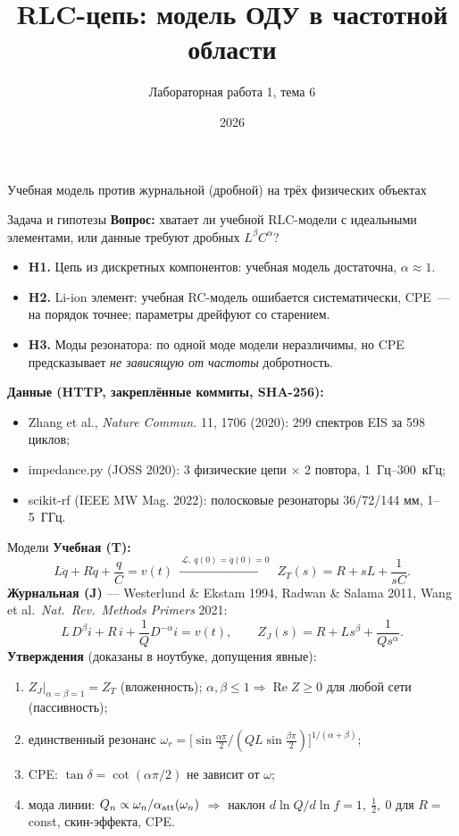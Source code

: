 \documentclass[aspectratio=169,11pt]{beamer}
\title{RLC-цепь: модель ОДУ в частотной области}
\subtitle{Лабораторная работа 1, тема 6}
\date{2026}
\begin{document}
\begin{frame}
  \titlepage
  \centering\small Учебная модель против журнальной (дробной) на трёх физических объектах
\end{frame}

\begin{frame}{Задача и гипотезы}
  \textbf{Вопрос:} хватает ли учебной RLC-модели с идеальными элементами, или данные требуют дробных $L^{\beta}C^{\alpha}$?
  \medskip
  \begin{itemize}
    \item \textbf{H1.} Цепь из дискретных компонентов: учебная модель достаточна, $\alpha\approx1$.
    \item \textbf{H2.} Li-ion элемент: учебная RC-модель ошибается систематически, CPE~--- на порядок точнее; параметры дрейфуют со старением.
    \item \textbf{H3.} Моды резонатора: по одной моде модели неразличимы, но CPE предсказывает \emph{не зависящую от частоты} добротность.
  \end{itemize}
  \medskip
  \textbf{Данные (HTTP, закреплённые коммиты, SHA-256):}
  \begin{itemize}\small
    \item Zhang et al., \emph{Nature Commun.} 11, 1706 (2020): 299 спектров EIS за 598 циклов;
    \item impedance.py (JOSS 2020): 3 физические цепи $\times$ 2 повтора, 1~Гц--300~кГц;
    \item scikit-rf (IEEE MW Mag. 2022): полосковые резонаторы 36/72/144 мм, 1--5~ГГц.
  \end{itemize}
\end{frame}

\begin{frame}{Модели}
  \textbf{Учебная (T):}
  \[
    L\ddot q+R\dot q+\frac{q}{C}=v(t)\ \xrightarrow{\ \mathcal L,\ q(0)=\dot q(0)=0\ }\ Z_T(s)=R+sL+\frac{1}{sC}.
  \]
  \textbf{Журнальная (J)} — Westerlund \& Ekstam 1994, Radwan \& Salama 2011, Wang et al.\ \emph{Nat.\ Rev.\ Methods Primers} 2021:
  \[
    L\,D^{\beta}i+R\,i+\frac1Q D^{-\alpha}i=v(t),\qquad Z_J(s)=R+Ls^{\beta}+\frac{1}{Qs^{\alpha}}.
  \]
  \textbf{Утверждения} (доказаны в ноутбуке, допущения явные):
  \begin{enumerate}\small
    \item $Z_J|_{\alpha=\beta=1}=Z_T$ (вложенность);\quad
          $\alpha,\beta\le1\Rightarrow\operatorname{Re}Z\ge0$ для любой сети (пассивность);
    \item единственный резонанс $\omega_r=\bigl[\sin\frac{\alpha\pi}{2}/(QL\sin\frac{\beta\pi}{2})\bigr]^{1/(\alpha+\beta)}$;
    \item CPE: $\tan\delta=\cot(\alpha\pi/2)$ не зависит от $\omega$;
    \item мода линии: $Q_n\propto\omega_n/\alpha_{\rm att}(\omega_n)$ $\Rightarrow$ наклон $d\ln Q/d\ln f=1,\ \tfrac12,\ 0$ для $R=$const, скин-эффекта, CPE.
  \end{enumerate}
\end{frame}
\end{document}
